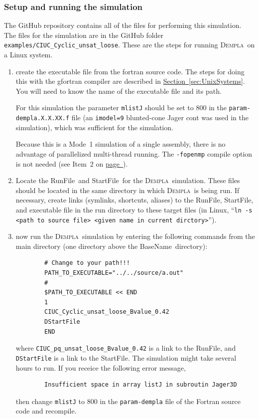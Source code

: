 \documentclass[letterpaper,11pt]{article}
\newcommand{\Dempla}{\textsc{Dempla}}
\newcommand{\RunFile}{\textsf{RunFile}}
\newcommand{\StartFile}{\textsf{StartFile}}
\newcommand{\BaseName}{\textsf{BaseName}}
\begin{document}
\subsubsection{Setup and running the simulation}\label{sec:setupCIUC}
The GitHub repository contains all of the files for
performing this simulation.
The files for the simulation
are in the GitHub folder
\texttt{examples/CIUC\_Cyclic\_unsat\_loose}.
These are the steps for running \Dempla\ on a Linux system.
%
\begin{enumerate}
	\item
	create the executable file from the fortran source code.
	The steps for doing this with the \textsf{gfortran}
	compiler are described in
	\hyperref[sec:UnixSystems]{Section~\ref*{sec:UnixSystems}}.
	You will need to know the name of the executable
	file and its path.
	\par
	For this simulation the parameter \texttt{mlistJ} should be
	set to 800 in the \texttt{param-dempla.X.X.XX.f} file
	(an \texttt{imodel=9} blunted-cone Jager cont
	was used in the simulation),
	which was sufficient for the simulation.
	\par
	Because this is a Mode~1 simulation of a single
	assembly, there is no advantage of parallelized
	multi-thread running.
	The \texttt{-fopenmp} compile option is not needed
	(see Item~2 on
	\hyperref[item:compile]{page~\pageref*{item:compile}}).
	\item
	Locate the \RunFile\ and \StartFile\ for the
	\Dempla\ simulation.
	These files should be located in the same directory
	in which \Dempla\ is being run.
	If necessary, create links (symlinks, shortcuts, aliases)
	to the \RunFile, \StartFile, and executable
	file in the run directory to these target files
	(in Linux,
	``\texttt{ln -s <path to source file> <given name in current dirctory>}'').
	\item
	now run the \Dempla\ simulation
	by entering the following commands from the main directory
	(one directory above the \BaseName\ directory):
	\begin{verbatim}
		# Change to your path!!!
		PATH_TO_EXECUTABLE="../../source/a.out"
		#
		$PATH_TO_EXECUTABLE << END
		1
		CIUC_Cyclic_unsat_loose_Bvalue_0.42
		DStartFile
		END
	\end{verbatim}
	where \texttt{CIUC\_pq\_unsat\_loose\_Bvalue\_0.42}
	is a link to the \RunFile,
	and \texttt{DStartFile} is a link to the \StartFile.
	The simulation might take several hours to run.
	If you receice the following error message,
	\begin{verbatim}
		Insufficient space in array listJ in subroutin Jager3D
	\end{verbatim}
	then change \texttt{mlistJ} to 800 in the
	\texttt{param-dempla} file of the Fortran source code
	and recompile.
\end{enumerate}
%
%
\end{document}
